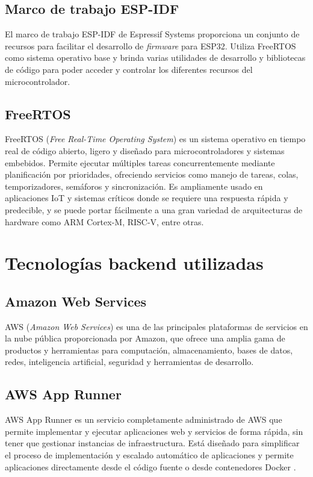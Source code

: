 \subsection{Marco de trabajo ESP-IDF}

El marco de trabajo ESP-IDF\cite{ESPIDF_home} de Espressif Systems proporciona un conjunto de recursos para facilitar el desarrollo de \textit{firmware} para ESP32. Utiliza FreeRTOS como sistema operativo base y brinda varias utilidades de desarrollo y bibliotecas de código para poder acceder y controlar los diferentes recursos del microcontrolador.


\subsection{FreeRTOS}

FreeRTOS (\textit{Free Real-Time Operating System}) \citep{FreeRTOS} es un sistema operativo en tiempo real de código abierto, ligero y diseñado para microcontroladores y sistemas embebidos. Permite ejecutar múltiples tareas concurrentemente mediante planificación por prioridades, ofreciendo servicios como manejo de tareas, colas, temporizadores, semáforos y sincronización. Es ampliamente usado en aplicaciones IoT y sistemas críticos donde se requiere una respuesta rápida y predecible, y se puede portar fácilmente a una gran variedad de arquitecturas de hardware como ARM Cortex-M, RISC-V, entre otras.

\section{Tecnologías backend utilizadas}


\subsection{Amazon Web Services}

AWS (\textit{Amazon Web Services}) \citep{aws}  es una de las principales plataformas de servicios en la nube pública proporcionada por Amazon, que ofrece una amplia gama de productos y herramientas para computación, almacenamiento, bases de datos, redes, inteligencia artificial, seguridad y herramientas de desarrollo.


\subsection{AWS App Runner}

AWS App Runner \citep{aws_app_runner} es un servicio completamente administrado de AWS que permite implementar y ejecutar aplicaciones web y servicios de forma rápida, sin tener que gestionar instancias de infraestructura. Está diseñado para simplificar el proceso de implementación y escalado automático de aplicaciones y permite aplicaciones directamente desde el código fuente o desde contenedores Docker \cite{docker_website}.



